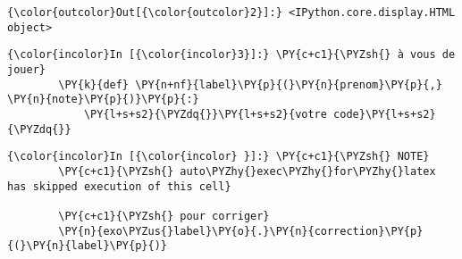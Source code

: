 \begin{Verbatim}[commandchars=\\\{\},frame=single,framerule=0.3mm,rulecolor=\color{cellframecolor}]
{\color{outcolor}Out[{\color{outcolor}2}]:} <IPython.core.display.HTML object>
\end{Verbatim}
            
    \begin{Verbatim}[commandchars=\\\{\},frame=single,framerule=0.3mm,rulecolor=\color{cellframecolor}]
{\color{incolor}In [{\color{incolor}3}]:} \PY{c+c1}{\PYZsh{} à vous de jouer}
        \PY{k}{def} \PY{n+nf}{label}\PY{p}{(}\PY{n}{prenom}\PY{p}{,} \PY{n}{note}\PY{p}{)}\PY{p}{:}
            \PY{l+s+s2}{\PYZdq{}}\PY{l+s+s2}{votre code}\PY{l+s+s2}{\PYZdq{}}
\end{Verbatim}


    \begin{Verbatim}[commandchars=\\\{\},frame=single,framerule=0.3mm,rulecolor=\color{cellframecolor}]
{\color{incolor}In [{\color{incolor} }]:} \PY{c+c1}{\PYZsh{} NOTE}
        \PY{c+c1}{\PYZsh{} auto\PYZhy{}exec\PYZhy{}for\PYZhy{}latex has skipped execution of this cell}
        
        \PY{c+c1}{\PYZsh{} pour corriger}
        \PY{n}{exo\PYZus{}label}\PY{o}{.}\PY{n}{correction}\PY{p}{(}\PY{n}{label}\PY{p}{)}
\end{Verbatim}



    
    
    
